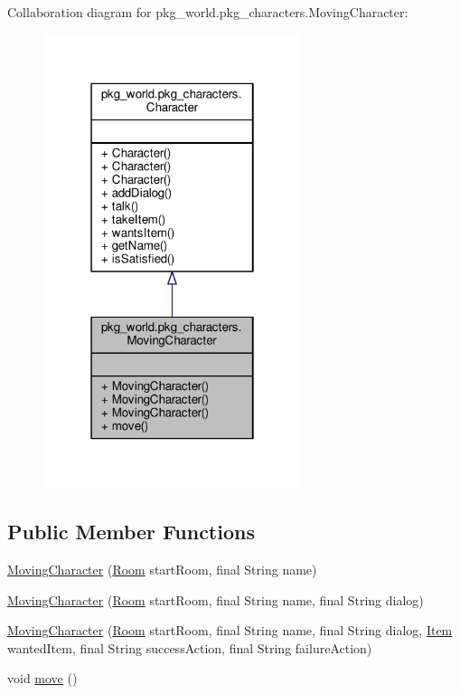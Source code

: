 Collaboration diagram for pkg\-\_\-world.\-pkg\-\_\-characters.\-Moving\-Character\-:
\nopagebreak
\begin{figure}[H]
\begin{center}
\leavevmode
\includegraphics[width=214pt]{classpkg__world_1_1pkg__characters_1_1MovingCharacter__coll__graph}
\end{center}
\end{figure}
\subsection*{Public Member Functions}
\begin{DoxyCompactItemize}
\item 
\hyperlink{classpkg__world_1_1pkg__characters_1_1MovingCharacter_aa8e7cc0d5fc072ea1bb2545cda28d7ee}{Moving\-Character} (\hyperlink{classpkg__world_1_1Room}{Room} start\-Room, final String name)
\item 
\hyperlink{classpkg__world_1_1pkg__characters_1_1MovingCharacter_a3ff1fb87a50e7370aea5e9da6ef8abe4}{Moving\-Character} (\hyperlink{classpkg__world_1_1Room}{Room} start\-Room, final String name, final String dialog)
\item 
\hyperlink{classpkg__world_1_1pkg__characters_1_1MovingCharacter_aa1857c9134647d712611944bfd9d793a}{Moving\-Character} (\hyperlink{classpkg__world_1_1Room}{Room} start\-Room, final String name, final String dialog, \hyperlink{classpkg__world_1_1pkg__items_1_1Item}{Item} wanted\-Item, final String success\-Action, final String failure\-Action)
\item 
void \hyperlink{classpkg__world_1_1pkg__characters_1_1MovingCharacter_aaf4df04191a12b44ecf4d5e127c3a969}{move} ()
\end{DoxyCompactItemize}


